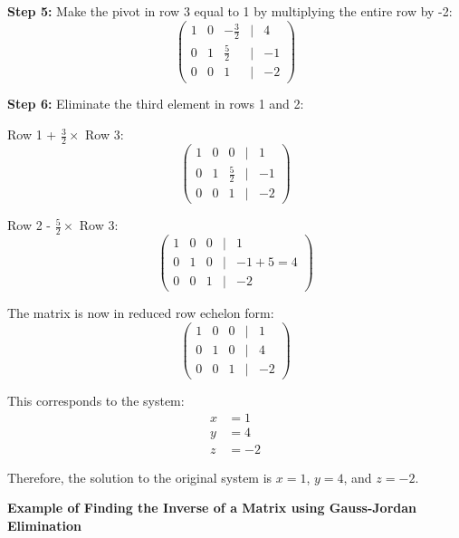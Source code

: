 \textbf{Step 5:} Make the pivot in row 3 equal to 1 by multiplying the entire row by -2:
\begin{equation*}
\begin{pmatrix}
1 & 0 & -\frac{3}{2} & | & 4 \\
0 & 1 & \frac{5}{2} & | & -1 \\
0 & 0 & 1 & | & -2
\end{pmatrix}
\end{equation*}

\textbf{Step 6:} Eliminate the third element in rows 1 and 2:

Row 1 + \(\frac{3}{2} \times\) Row 3:
\begin{equation*}
\begin{pmatrix}
1 & 0 & 0 & | & 1 \\
0 & 1 & \frac{5}{2} & | & -1 \\
0 & 0 & 1 & | & -2
\end{pmatrix}
\end{equation*}

Row 2 - \(\frac{5}{2} \times\) Row 3:
\begin{equation*}
\begin{pmatrix}
1 & 0 & 0 & | & 1 \\
0 & 1 & 0 & | & -1 + 5 = 4 \\
0 & 0 & 1 & | & -2
\end{pmatrix}
\end{equation*}

The matrix is now in reduced row echelon form:
\begin{equation*}
\begin{pmatrix}
1 & 0 & 0 & | & 1 \\
0 & 1 & 0 & | & 4 \\
0 & 0 & 1 & | & -2
\end{pmatrix}
\end{equation*}

This corresponds to the system:
\begin{align*}
x &= 1 \\
y &= 4 \\
z &= -2
\end{align*}

Therefore, the solution to the original system is \(x = 1\), \(y = 4\), and \(z = -2\).
\vspace{\baselineskip}

\textbf{Example of Finding the Inverse of a Matrix using Gauss-Jordan Elimination}
\vspace{\baselineskip}

